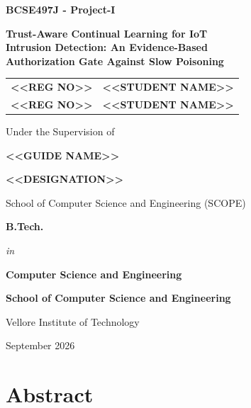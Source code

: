 \documentclass[12pt,a4paper]{report}
\begin{document}
\begin{titlepage}
\centering
{\large\bfseries BCSE497J - Project-I\par}          %
\vspace{1.4cm}
{\Large\bfseries Trust-Aware Continual Learning for IoT\\[3pt]
Intrusion Detection: An Evidence-Based\\[3pt]
Authorization Gate Against Slow Poisoning\par}
\vspace{1.4cm}
{\normalsize
\begin{tabular}{ll}
\textbf{<<REG NO>>} & \textbf{<<STUDENT NAME>>}\\        %
\textbf{<<REG NO>>} & \textbf{<<STUDENT NAME>>}\\        %
\end{tabular}\par}
\vspace{1.2cm}
{\normalsize Under the Supervision of\par}
\vspace{0.5cm}
{\normalsize\bfseries <<GUIDE NAME>>\par}                %
{\normalsize\bfseries <<DESIGNATION>>\par}               %
{\normalsize School of Computer Science and Engineering (SCOPE)\par}
\vspace{1.6cm}
{\normalsize\bfseries B.Tech.\par}
{\normalsize\itshape in\par}
{\normalsize\bfseries Computer Science and Engineering\par}
\vspace{0.4cm}
{\normalsize\bfseries School of Computer Science and Engineering\par}
\vspace{1.6cm}
{\normalsize Vellore Institute of Technology\par}
\vspace{0.8cm}
{\normalsize September 2026\par}
\end{titlepage}

\setcounter{page}{1}

\chapter*{Abstract}
\end{document}
